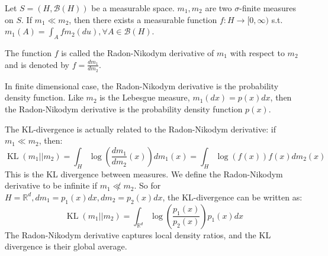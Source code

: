 \begin{theorem}
  Let $S = (H,\mathcal{B}(H))$ be a measurable space. $m_1, m_2$ are two $\sigma$-finite measures on $S$. If $m_1 \ll m_2$, then there exists a measurable function $f:H\rightarrow [0, \infty)$ s.t. $m_1(A) = \int_A f m_2(du), \forall A \in \mathcal{B}(H)$.

  The function $f$ is called the Radon-Nikodym derivative of $m_1$ with respect to $m_2$ and is denoted by $f = \frac{dm_1}{dm_2}$.
\end{theorem}

\begin{example}
  In finite dimensional case, the Radon-Nikodym derivative is the probability density function. 
  Like $m_2$ is the Lebesgue measure, $m_1(dx) = p(x)dx$, then the Radon-Nikodym derivative is the probability density function $p(x)$. 
\end{example}

\begin{definition}[KL-divergence]
  The KL-divergence is actually related to the Radon-Nikodym derivative: if $m_1 \ll m_2$, then:
  \begin{equation}
    \operatorname{KL}(m_1||m_2) = \int_H \log\left(\frac{dm_1}{dm_2}(x)\right) dm_1(x) 
    = \int_H \log\left(f(x)\right) f(x)dm_2(x)
  \end{equation}
  This is the KL divergence between measures. We define the Radon-Nikodym derivative to be infinite if $m_1 \not\ll m_2$.
  So for $H=\mathbb{R}^d, dm_1 = p_1(x)dx, dm_2 = p_2(x)dx$, the KL-divergence can be written as:
  \begin{equation}
    \operatorname{KL}(m_1||m_2) = \int_{\mathbb{R}^d} \log\left(\frac{p_1(x)}{p_2(x)}\right) p_1(x) dx
  \end{equation}
  The Radon-Nikodym derivative captures local density ratios, and the KL divergence is their global average.
\end{definition}

